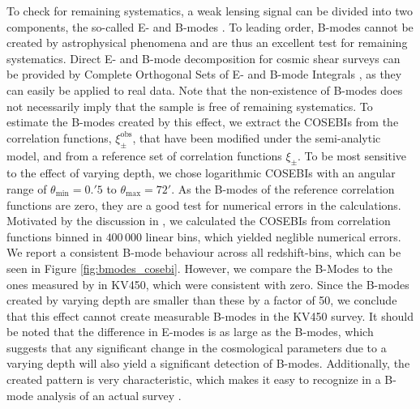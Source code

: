 \documentclass{aa}
\renewcommand{\rm}{\mathrm}
\begin{document}
To check for remaining systematics, a weak lensing signal can be divided into two components, the so-called E- and B-modes \citep{2002ApJ...568...20C,2002A&A...389..729S}. To leading order, B-modes cannot be created by astrophysical phenomena and are thus an excellent test for remaining systematics. Direct E- and B-mode decomposition for cosmic shear surveys can be provided by Complete Orthogonal Sets of E- and B-mode Integrals \citep[COSEBIs,][hereafter S10]{2010A&A...520A.116S}, as they can easily be applied to real data. Note that the non-existence of B-modes does not necessarily imply that the sample is free of remaining systematics.
To estimate the B-modes created by this effect, we extract the COSEBIs
 from the correlation functions, $\xi_\pm^{\rm{obs}}$, that have been modified under the semi-analytic model, and from a reference set of correlation functions $\xi_\pm$. To be most sensitive to the effect of varying depth, we chose logarithmic COSEBIs with an angular range of $\theta_{\rm{min}}=0.\!'5$ to $\theta_{\rm{max}}=72'$. As the B-modes of the reference correlation functions are zero, they are a good test for numerical errors in the calculations. Motivated by the discussion in \citet{2017MNRAS.464.1676A}, we calculated the COSEBIs from correlation functions binned in $400\,000$ linear bins, which yielded neglible numerical errors. We report a consistent B-mode behaviour across all redshift-bins, which can be seen in Figure \ref{fig:bmodes_cosebi}. However, we compare the B-Modes to the ones measured by \citet{asgari/etal:2019} in KV450, which were consistent with zero. Since the B-modes created by varying depth are smaller than these by a factor of 50, we conclude that this effect cannot create measurable B-modes in the KV450 survey. It should be noted that the difference in E-modes is as large as the B-modes, which suggests that any significant change in the cosmological parameters due to a varying depth will also yield a significant detection of B-modes. Additionally, the created pattern is very characteristic, which makes it easy to recognize in a B-mode analysis of an actual survey \citep[see][]{2018arXiv181002353A}.


\end{document}

